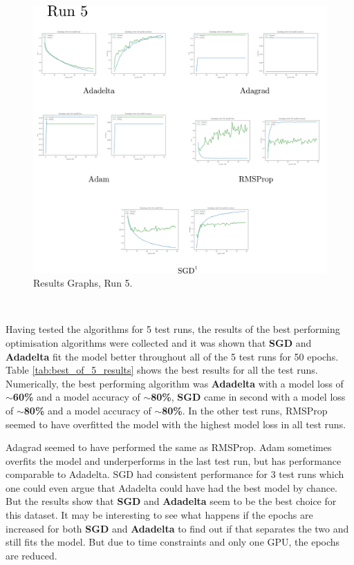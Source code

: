 \documentclass[report, 11pt, oneside]{dissertation}
\begin{document}
\begin{figure}[H]
   \centering
	\includegraphics[scale=0.20]{figure_35.pdf}
	\caption{Results Graphs, Run 5.}
	\label{fig:results_graphs_5}
\end{figure}



\ \

Having tested the algorithms for 5 test runs, the results of the best performing optimisation algorithms were collected and it was shown that \textbf{SGD} and \textbf{Adadelta} fit the model better throughout all of the 5 test runs for 50 epochs. Table \ref{tab:best_of_5_results} shows the best results for all the test runs. Numerically, the best performing algorithm was \textbf{Adadelta} with a model loss of \textbf{$\sim$60\%} and a model accuracy of \textbf{$\sim$80\%}, \textbf{SGD} came in second  with a model loss of \textbf{$\sim$80\%} and a model accuracy of \textbf{$\sim$80\%}. In the other test runs, RMSProp seemed to have overfitted the model with the highest model loss in all test runs. 

Adagrad seemed to have performed the same as RMSProp. Adam sometimes overfits the model and underperforms in the last test run, but has performance comparable to Adadelta. SGD had consistent performance for 3 test runs which one could even argue that Adadelta could have had the best model by chance. But the results show that \textbf{SGD} and \textbf{Adadelta} seem to be the best choice for this dataset. It may be interesting to see what happens if the epochs are increased for both \textbf{SGD} and \textbf{Adadelta} to find out if that separates the two and still fits the model. But due to time constraints and only one GPU, the epochs are reduced. 
\end{document}
